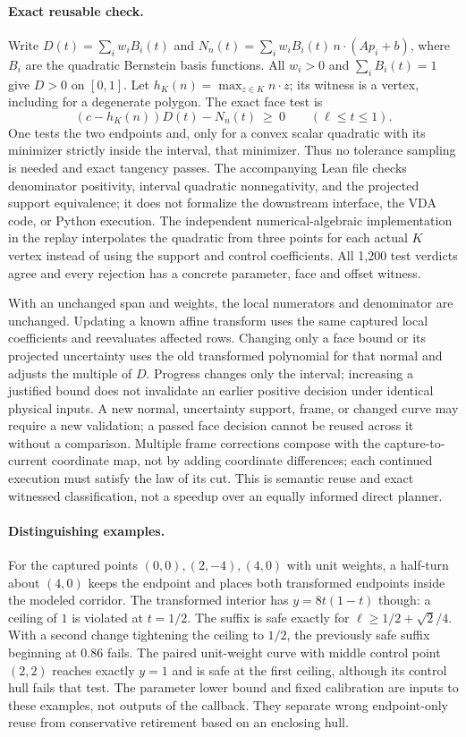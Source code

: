 \documentclass[11pt]{article}
\begin{document}
\paragraph{Exact reusable check.}
Write $D(t)=\sum_i w_i B_i(t)$ and
$N_n(t)=\sum_i w_i B_i(t)\,n\mathbin\cdot(Ap_i+b)$,
where $B_i$ are the quadratic Bernstein basis functions.
All $w_i>0$ and $\sum_i B_i(t)=1$ give $D>0$ on $[0,1]$.
Let $h_K(n)=\max_{z\in K}n\mathbin\cdot z$; its witness is a vertex,
including for a degenerate polygon. The exact face test is
\[
  (c-h_K(n))D(t)-N_n(t)\ \geq\ 0 \qquad(\ell\le t\le1).
\]
One tests the two endpoints and, only for a convex scalar quadratic
with its minimizer strictly inside the interval, that minimizer.
Thus no tolerance sampling is needed and exact tangency passes. The
accompanying Lean file checks denominator positivity, interval quadratic
nonnegativity, and the projected support equivalence; it does not
formalize the downstream interface, the VDA code, or Python execution.
The independent numerical-algebraic implementation in the replay
interpolates the quadratic from three points for each actual $K$ vertex
instead of using the support and control coefficients. All 1{,}200
test verdicts agree and every rejection has a concrete parameter,
face and offset witness.

With an unchanged span and weights, the local numerators and denominator
are unchanged. Updating a known affine transform uses the same captured
local coefficients and reevaluates affected rows. Changing only a
face bound or its projected uncertainty uses the old transformed
polynomial for that normal and adjusts the multiple of $D$.
Progress changes only the interval; increasing a justified bound does
not invalidate an earlier positive decision under identical physical
inputs. A new normal, uncertainty support, frame, or changed curve may
require a new validation; a passed face decision cannot be reused
across it without a comparison. Multiple frame corrections compose
with the capture-to-current coordinate map, not by adding coordinate
differences; each continued execution must satisfy the law of its cut.
This is semantic reuse and exact witnessed classification, not a
speedup over an equally informed direct planner.

\paragraph{Distinguishing examples.}
For the captured points $(0,0),(2,-4),(4,0)$ with unit weights, a
half-turn about $(4,0)$ keeps the endpoint and places both transformed
endpoints inside the modeled corridor. The transformed interior
has $y=8t(1-t)$ though: a ceiling of $1$ is violated at $t=1/2$.
The suffix is safe exactly for
$\ell\geq 1/2+\sqrt 2/4$. With a second change tightening the ceiling to
$1/2$, the previously safe suffix beginning at $0.86$ fails. The
paired unit-weight curve with middle control point $(2,2)$ reaches
exactly $y=1$ and is safe at the first ceiling, although its control
hull fails that test. The parameter lower bound and fixed calibration
are inputs to these examples, not outputs of the callback. They
separate wrong endpoint-only reuse from conservative retirement
based on an enclosing hull.
\end{document}
